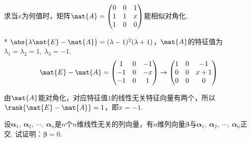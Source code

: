 \begin{problem}
    求当$x$为何值时，矩阵$\mat{A}=\begin{pmatrix}
        0 & 0 & 1\\ 1 & 1 & x\\ 1 & 0 & 0
    \end{pmatrix}$能相似对角化.
\end{problem}
\begin{solution}*
    $\abs{\lambda\mat{E}-\mat{A}}=(\lambda-1)^2(\lambda+1)$，$\mat{A}$的特征值为$\lambda_1=\lambda_2=1,\ \lambda_3=-1$.
    \[\mat{E}-\mat{A}=\begin{pmatrix}
        1 & 0 & -1\\
        -1 & 0 & -x\\
        -1 & 0 & 1
    \end{pmatrix}\to
    \begin{pmatrix}
        1 & 0 & -1\\
        0 & 0 & x+1\\
        0 & 0 & 0
    \end{pmatrix}\]

    由$\mat{A}$能对角化，对应特征值$1$的线性无关特征向量有两个，所以$\rank{\mat{E}-\mat{A}}=1$，即$x=-1$.
\end{solution}

\begin{problem}
    设$\bm{\alpha}_1,\ \bm{\alpha}_2,\ \cdots,\ \bm{\alpha}_n$是$n$个$n$维线性无关的列向量，有$n$维列向量$\bm{\beta}$与$\bm{\alpha}_1,\ \bm{\alpha}_2,\ \cdots,\ \bm{\alpha}_n$正交. 试证明：$\bm{\beta}=0$.
\end{problem}

